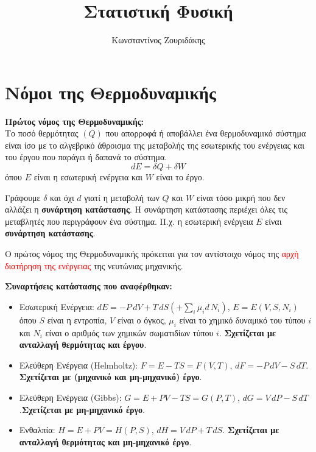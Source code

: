\documentclass[11pt, oneside]{article}   	%
\title{Στατιστική Φυσική}
\author{Κωνσταντίνος Ζουριδάκης}
\date{}							%
\newcommand{\definition}[1]{
	\begin{tcolorbox}[colback=blue!5!white,colframe=blue!75!black,title=\textbf{Ορισμός}]
		\begin{center}
			#1
		\end{center}
	\end{tcolorbox}
}
\newcommand{\note}[1]{
	\begin{tcolorbox}[colback=yellow!5!white,colframe=yellow!75!black,title=\textbf{Σημείωση}]
		\begin{center}
			#1
		\end{center}
	\end{tcolorbox}
}
\begin{document}
\maketitle

\tableofcontents
\newpage

\section{Νόμοι της Θερμοδυναμικής}

\definition{\textbf{Πρώτος νόμος της Θερμοδυναμικής:}\\ Το ποσό θερμότητας $(Q)$ που απορροφά ή αποβάλλει ένα θερμοδυναμικό σύστημα είναι ίσο με το αλγεβρικό άθροισμα της μεταβολής της εσωτερικής του ενέργειας και του έργου που παράγει ή δαπανά το σύστημα. \[dE = \delta Q + \delta W\] όπου $E$ είναι η εσωτερική ενέργεια και $W$ είναι το έργο.}

\note{Γράφουμε $\delta$ και όχι $d$ γιατί η μεταβολή των $Q$ και $W$ είναι τόσο μικρή που δεν αλλάζει η \textbf{συνάρτηση κατάστασης}. Η συνάρτηση κατάστασης περιέχει όλες τις μεταβλητές που περιγράφουν ένα σύστημα. Π.χ. η εσωτερική ενέργεια $E$ είναι \textbf{συνάρτηση κατάστασης}.}

Ο πρώτος νόμος της Θερμοδυναμικής πρόκειται για τον αντίστοιχο νόμος της \textcolor{red}{αρχή διατήρηση της ενέργειας} της νευτώνιας μηχανικής.

\note{\textbf{Συναρτήσεις κατάστασης που αναφέρθηκαν:}\\\begin{itemize}
		\item Εσωτερική Ενέργεια: $dE=-P \, dV + T \, dS(+ \sum_i \mu_i d \, N_i)$, $E=E(V,S,N_i)$ όπου $S$ είναι η εντροπία, $V$ είναι ο όγκος, $\mu_i$ είναι το χημικό δυναμικό του τύπου $i$ και $N_i$ είναι ο αριθμός των χημικών σωματιδίων τύπου $i$. \textbf{Σχετίζεται με ανταλλαγή θερμότητας και έργου}.
		
		\item Ελεύθερη Ενέργεια (Helmholtz): $F = E - TS = F(V,T)$, $dF=-P \, dV- S \, dT$. \textbf{Σχετίζεται με (μηχανικό και μη-μηχανικό) έργο}.
		
		\item Ελεύθερη Ενέργεια (Gibbs): $G = E + PV-TS = G(P,T)$, $dG=V \, dP - S \, dT$.\textbf{Σχετίζεται με μη-μηχανικό έργο}.
		
		\item Ενθαλπία: $H=E+PV=H(P,S)$, $dH=V \, dP+ T \, dS$. \textbf{Σχετίζεται με ανταλλαγή θερμότητας και μη-μηχανικό έργο}.
\end{itemize}}
\end{document}
